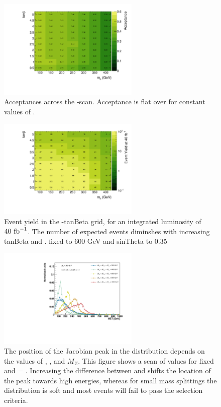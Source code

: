 \begin{figure}
\centering
\includegraphics[width=0.6\textwidth]{texinputs/04_grid/figures/monoz/leptonic/tanbma_ae_ll.pdf}
\caption{Acceptances across the \ma-\tanb scan.  Acceptance is flat over \tanb for constant values of \ma.}
\label{fig:monoz_ll_tanbma_acceptance}
\end{figure}

\begin{figure}
\centering
\includegraphics[width=0.6\textwidth]{texinputs/04_grid/figures/monoz/leptonic/tanbma_yield_ll.pdf}
\caption{Event yield in the \ma-tanBeta grid, for an integrated luminosity of $40~\rm{fb}^{-1}$.  The number of expected events diminshes with increasing tanBeta and \ma.  \mA fixed to 600 GeV and sinTheta to 0.35}
\end{figure}



\begin{figure}
\centering
\includegraphics[width=0.6\textwidth]{texinputs/04_grid/figures/monoz/leptonic/mAscan_for_ma200_axis.pdf}
\caption{The position of the Jacobian peak in the \MET distribution depends on the values of \mH, \ma, and $M_{Z}$.  This figure shows a scan of \mH values for fixed \ma and \mA = \mH.  Increasing the difference between \mH and \ma shifts the location of the peak towards high energies, whereas for small mass splittings the \MET distribution is soft and most events will fail to pass the \MET selection criteria.}   
\label{fig:monoz_ll_mA_scan}
\end{figure}

